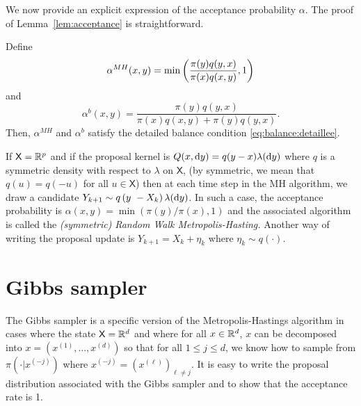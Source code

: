\documentclass[english,graybox,envcountchap,envcountsame,sectrefs,shortlabels]{svmono}
\theoremstyle{style}
\newcommand{\xset}{\ensuremath{\mathsf{X}}}
\newcommand{\Xset}{\mathsf{X}}
\begin{document}
We now provide an explicit expression of the acceptance probability $\alpha$. The proof of Lemma~\ref{lem:acceptance} is straightforward.


\begin{lemma}
\label{lem:acceptance} Define 
$$
\alpha^{MH}(x,y)=\min\left(\frac{\pi(y)q(y,x)}{\pi(x)q(x,y)},1\right)
$$
and 
$$
\alpha^{b}(x,y)=\frac{\pi(y)q(y,x)}{\pi(x)q(x,y)+\pi(y)q(y,x)}.
$$
Then, $\alpha^{MH}$ and $\alpha^{b}$ satisfy
the detailed balance condition \eqref{eq:balance:detaillee}. 
\end{lemma}




\begin{example}
If $\Xset=\rset^{p}$ and if
the proposal kernel is $Q(x,\mathrm{d} y)=q(y-x)\lambda(\mathrm{d} y)$ where
$q$ is a symmetric density with respect to $\lambda$ on $\Xset$, (by symmetric,
we mean that $q(u)=q(-u)$ for all $u\in\Xset$) then at each time
step in the MH algorithm, we draw a candidate $Y_{k+1}\sim q\left(y\ -X_{k}\right)\lambda(\mathrm{d} y)$.
In such a case, the acceptance probability is $\alpha(x,y)=\min\left(\pi(y)/\pi(x),1\right)$
and the associated algorithm is called the \emph{(symmetric)} \emph{Random
Walk Metropolis-Hasting.}\textbf{ }Another way of writing the proposal
update is $Y_{k+1}=X_{k}+\eta_{k}$ where $\eta_{k}\sim q(\cdot)$.
\end{example}



\section*{Gibbs sampler}
The Gibbs sampler is a specific version of the  Metropolis-Hastings algorithm  in cases where the state $\xset = \rset^d$ and where for all $x\in\mathbb{R}^d$, $x$ can be decomposed into $x = (x^{(1)},\ldots,x^{(d)})$ so that for all $1\leq j \leq d$,  we know how to sample from $\pi(\cdot |x^{(-j)})$ where $x^{(-j)} = (x^{(\ell)})_{\ell \neq j}$. It is easy to write the proposal distribution associated with the Gibbs sampler and to show that the acceptance rate is 1.
\end{document}
